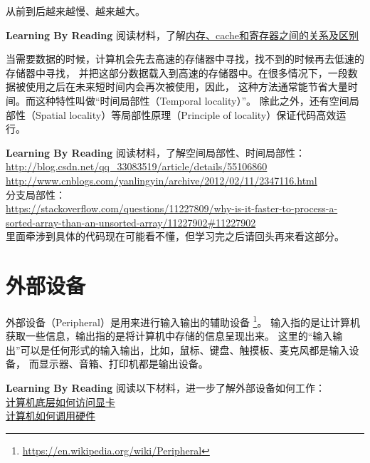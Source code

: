 从前到后越来越慢、越来越大。
\begin{paperbox}{\textbf{Learning By Reading}\starthree}
阅读材料，了解\href{http://blog.csdn.net/hellojoy/article/details/54744231}{内存、cache和寄存器之间的关系及区别}
\end{paperbox}
当需要数据的时候，计算机会先去高速的存储器中寻找，找不到的时候再去低速的存储器中寻找，
并把这部分数据载入到高速的存储器中。在很多情况下，一段数据被使用之后在未来短时间内会再次被使用，因此，
这种方法通常能节省大量时间。而这种特性叫做“时间局部性（Temporal locality）”。
除此之外，还有空间局部性（Spatial locality）等局部性原理（Principle of locality）保证代码高效运行。
\begin{paperbox}{\textbf{Learning By Reading}\startwo}
阅读材料，了解空间局部性、时间局部性：\\
\url{http://blog.csdn.net/qq_33083519/article/details/55106860}\\
\url{http://www.cnblogs.com/yanlingyin/archive/2012/02/11/2347116.html}\\
分支局部性：\\
\url{https://stackoverflow.com/questions/11227809/why-is-it-faster-to-process-a-sorted-array-than-an-unsorted-array/11227902#11227902}\\
里面牵涉到具体的代码现在可能看不懂，但学习完之后请回头再来看这部分。
\end{paperbox}
\section{外部设备}
外部设备（Peripheral）是用来进行输入输出的辅助设备
\footnote{\url{https://en.wikipedia.org/wiki/Peripheral}}。
输入指的是让计算机获取一些信息，输出指的是将计算机中存储的信息呈现出来。
这里的“输入输出”可以是任何形式的输入输出，比如，鼠标、键盘、触摸板、麦克风都是输入设备，
而显示器、音箱、打印机都是输出设备。\\
\begin{paperbox}{\textbf{Learning By Reading}\starone}
阅读以下材料，进一步了解外部设备如何工作：\\
\href{https://www.zhihu.com/question/20722310}{计算机底层如何访问显卡}\\
\href{https://www.zhihu.com/question/39846396}{计算机如何调用硬件}
\end{paperbox}
